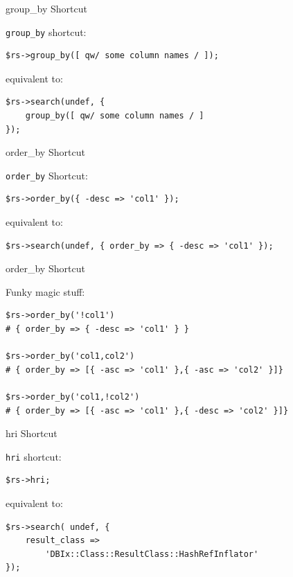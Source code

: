 \begin{frame}[fragile]{group\_by Shortcut}

\verb|group_by| shortcut:

\begin{lstlisting}
$rs->group_by([ qw/ some column names / ]);
\end{lstlisting}

equivalent to:

\begin{lstlisting}
$rs->search(undef, { 
    group_by([ qw/ some column names / ] 
});
\end{lstlisting}
\end{frame}

\begin{frame}[fragile]{order\_by Shortcut}

\verb|order_by| Shortcut:

\begin{lstlisting}
$rs->order_by({ -desc => 'col1' });
\end{lstlisting}

equivalent to:

\begin{lstlisting}
$rs->search(undef, { order_by => { -desc => 'col1' });
\end{lstlisting}

\end{frame}

\begin{frame}[fragile]{order\_by Shortcut}

Funky magic stuff:
\begin{lstlisting}
$rs->order_by('!col1')
# { order_by => { -desc => 'col1' } }

$rs->order_by('col1,col2')
# { order_by => [{ -asc => 'col1' },{ -asc => 'col2' }]}

$rs->order_by('col1,!col2')
# { order_by => [{ -asc => 'col1' },{ -desc => 'col2' }]}
\end{lstlisting}
\end{frame}

\begin{frame}[fragile]{hri Shortcut}

\verb|hri| shortcut:

\begin{lstlisting}
$rs->hri;
\end{lstlisting}

equivalent to:

\begin{lstlisting}
$rs->search( undef, {
    result_class => 
        'DBIx::Class::ResultClass::HashRefInflator'
});
\end{lstlisting}
\end{frame}

